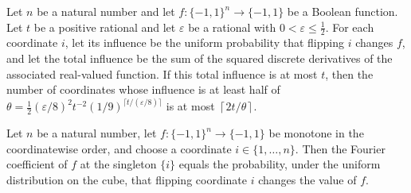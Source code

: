 \begin{theorem}
\label{FABL.card_halfThresholdInfluentialCoordinates_le}
\leanok
{}
Let $n$ be a natural number and let $f:\{-1,1\}^n\to\{-1,1\}$ be a Boolean
function. Let $t$ be a positive rational and let $\varepsilon$ be a rational with
$0<\varepsilon\leq\frac12$. For each coordinate $i$, let its influence be the uniform
probability that flipping $i$ changes $f$, and let the total influence be the sum of the
squared discrete derivatives of the associated real-valued function. If this total
influence is at most $t$, then the number of coordinates whose influence is at least
half of $\theta=\frac12(\varepsilon/8)^2t^{-2}(1/9)^{\lceil t/
(\varepsilon/8)\rceil}$ is at most $\left\lceil 2t/\theta\right\rceil$.
\end{theorem}

\begin{theorem}
\label{FABL.fourierCoeff_singleton_eq_booleanInfluence_of_monotone}
\leanok
{}
Let $n$ be a natural number, let $f:\{-1,1\}^n\to\{-1,1\}$ be monotone in the
coordinatewise order, and choose a coordinate $i\in\{1,\ldots,n\}$. Then the Fourier
coefficient of $f$ at the singleton $\{i\}$ equals the probability, under the uniform
distribution on the cube, that flipping coordinate $i$ changes the value of $f$.
\end{theorem}

